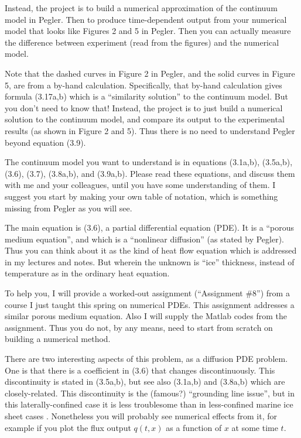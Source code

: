 \documentclass[11pt,final]{amsart}%
\begin{document}
Instead, the project is to build a numerical approximation of the continuum model in Pegler.  Then to produce time-dependent output from your numerical model that looks like Figures 2 and 5 in Pegler.  Then you can actually measure the difference between experiment (read from the figures) and the numerical model.

Note that the dashed curves in Figure 2 in Pegler, and the solid curves in Figure 5, are from a by-hand calculation.  Specifically, that by-hand calculation gives formula (3.17a,b) which is a ``similarity solution'' to the continuum model.  But you don't need to know that!  Instead, the project is to just build a numerical solution to the continuum model, and compare its output to the experimental results (as shown in Figure 2 and 5).  Thus there is no need to understand Pegler beyond equation (3.9).

The continuum model you want to understand is in equations (3.1a,b), (3.5a,b), (3.6), (3.7), (3.8a,b), and (3.9a,b).  Please read these equations, and discuss them with me and your colleagues, until you have some understanding of them.  I suggest you start by making your own table of notation, which is something missing from Pegler as you will see.

The main equation is (3.6), a partial differential equation (PDE).  It is a ``porous medium equation'', and which is a ``nonlinear diffusion'' (as stated by Pegler).  Thus you can think about it as the kind of heat flow equation which is addressed in my lectures and notes.  But wherein the unknown is ``ice'' thickness, instead of temperature as in the ordinary heat equation.

To help you, I will provide a worked-out assignment (``Assignment \#8'') from a course I just taught this spring on numerical PDEs.  This assignment addresses a similar porous medium equation.  Also I will supply the Matlab codes from the assignment.  Thus you do not, by any means, need to start from scratch on building a numerical method.

There are two interesting aspects of this problem, as a diffusion PDE problem.  One is that there is a coefficient in (3.6) that changes discontinuously.  This discontinuity is stated in (3.5a,b), but see also (3.1a,b) and (3.8a,b) which are closely-related.  This discontinuity is the (famous?) ``grounding line issue'', but in this laterally-confined case it is less troublesome than in less-confined marine ice sheet cases \citep[in particular]{SchoofMarine1}.  Nonetheless you will probably see numerical effects from it, for example if you plot the flux output $q(t,x)$ as a function of $x$ at some time $t$.
\end{document}
